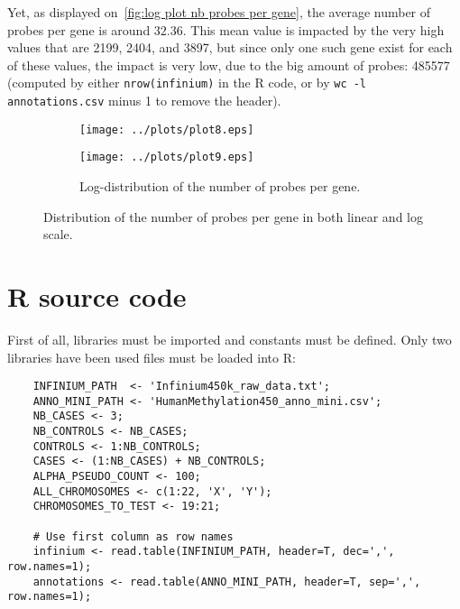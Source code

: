 \documentclass{article}
\begin{document}
Yet, as displayed on~\autoref{fig:log plot nb probes per gene}, the average number of probes per gene is around $32.36$. This mean value is
impacted by the very high values that are 2199, 2404, and 3897, but since only one such gene exist for each of these values, the impact is
very low, due to the big amount of probes: 485577 (computed by either \texttt{nrow(infinium)} in the R code, or by \texttt{wc -l annotations.csv}
minus 1 to remove the header).

\begin{figure}[!b]
	\begin{subfigure}{.5\textwidth}
		\texttt{[image: ../plots/plot8.eps]}
	\end{subfigure}
	\begin{subfigure}{.5\textwidth}
		\texttt{[image: ../plots/plot9.eps]}
		\caption{Log-distribution of the number of probes per gene.\label{fig:log plot nb probes per gene}}
	\end{subfigure}
	\caption{Distribution of the number of probes per gene in both linear and log scale.\label{fig:number of probes per gene}}
\end{figure}

\newpage
\section{R source code}

First of all, libraries must be imported and constants must be defined. Only two libraries have been used files must be loaded into R:

\begin{lstlisting}
	INFINIUM_PATH  <- 'Infinium450k_raw_data.txt';
	ANNO_MINI_PATH <- 'HumanMethylation450_anno_mini.csv';
	NB_CASES <- 3;
	NB_CONTROLS <- NB_CASES;
	CONTROLS <- 1:NB_CONTROLS;
	CASES <- (1:NB_CASES) + NB_CONTROLS;
	ALPHA_PSEUDO_COUNT <- 100;
	ALL_CHROMOSOMES <- c(1:22, 'X', 'Y');
	CHROMOSOMES_TO_TEST <- 19:21;

	# Use first column as row names
	infinium <- read.table(INFINIUM_PATH, header=T, dec=',', row.names=1);
	annotations <- read.table(ANNO_MINI_PATH, header=T, sep=',', row.names=1);
\end{lstlisting}
\end{document}
